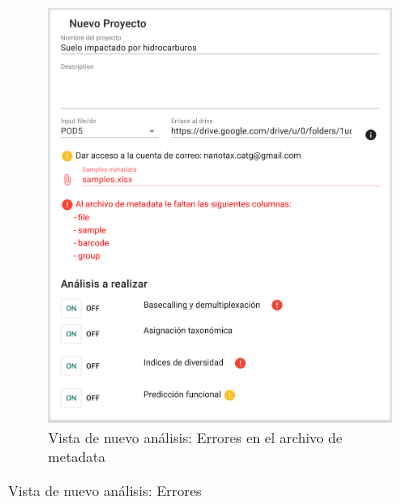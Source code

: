 \begin{itemize}
\begin{figure}[H]
\begin{subfigure}[b]{0.45\textwidth}
        \includegraphics[width=\textwidth]{images/app/newAnalysis/metadata-error-1.png}
        \caption{Vista de nuevo análisis: Errores en el archivo de metadata}
        \label{fig:app-new-analysis-metadata-error}
    \end{subfigure}
    \caption{Vista de nuevo análisis: Errores }
    \label{fig:app-new-analysis-metadata-nodata-error}
\end{figure}











\end{itemize}

